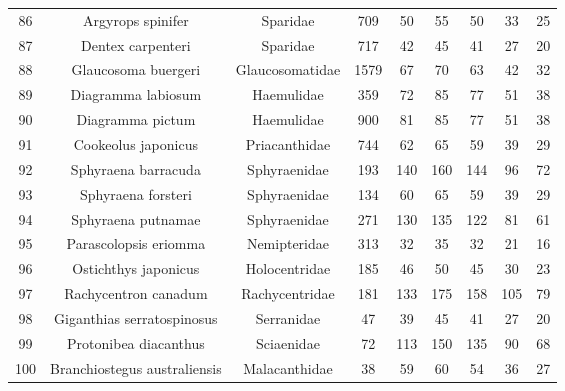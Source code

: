 {\begin{longtable}{ccccccccc}
  86 & Argyrops spinifer & Sparidae & 709 & 50 & 55 & 50 & 33 & 25 \\ 
  87 & Dentex carpenteri & Sparidae & 717 & 42 & 45 & 41 & 27 & 20 \\ 
  88 & Glaucosoma buergeri & Glaucosomatidae & 1579 & 67 & 70 & 63 & 42 & 32 \\ 
  89 & Diagramma labiosum & Haemulidae & 359 & 72 & 85 & 77 & 51 & 38 \\ 
  90 & Diagramma pictum & Haemulidae & 900 & 81 & 85 & 77 & 51 & 38 \\ 
  91 & Cookeolus japonicus & Priacanthidae & 744 & 62 & 65 & 59 & 39 & 29 \\ 
  92 & Sphyraena barracuda & Sphyraenidae & 193 & 140 & 160 & 144 & 96 & 72 \\ 
  93 & Sphyraena forsteri & Sphyraenidae & 134 & 60 & 65 & 59 & 39 & 29 \\ 
  94 & Sphyraena putnamae & Sphyraenidae & 271 & 130 & 135 & 122 & 81 & 61 \\ 
  95 & Parascolopsis eriomma & Nemipteridae & 313 & 32 & 35 & 32 & 21 & 16 \\ 
  96 & Ostichthys japonicus & Holocentridae & 185 & 46 & 50 & 45 & 30 & 23 \\ 
  97 & Rachycentron canadum & Rachycentridae & 181 & 133 & 175 & 158 & 105 & 79 \\ 
  98 & Giganthias serratospinosus & Serranidae & 47 & 39 & 45 & 41 & 27 & 20 \\ 
  99 & Protonibea diacanthus & Sciaenidae & 72 & 113 & 150 & 135 & 90 & 68 \\ 
  100 & Branchiostegus australiensis & Malacanthidae & 38 & 59 & 60 & 54 & 36 & 27 \\ 
   \hline
\hline
\end{longtable}
}
 
\clearpage
\newpage

